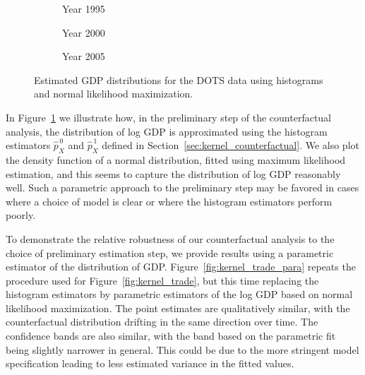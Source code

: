 \documentclass[11pt,lof]{puthesis}
\theoremstyle{break}
\theoremstyle{proof}
\begin{document}
\begin{figure}[b!]
\centering
%
\begin{subfigure}{0.32\textwidth}
\centering
\caption{Year 1995}
\end{subfigure}
%
\begin{subfigure}{0.32\textwidth}
\centering
\caption{Year 2000}
\end{subfigure}
%
\begin{subfigure}{0.32\textwidth}
\centering
\caption{Year 2005}
\end{subfigure}
%
\caption[Estimated GDP distributions for the DOTS data]{
Estimated GDP distributions for the DOTS data using histograms and
normal likelihood maximization.}
%
\label{fig:kernel_gdp}
%
\end{figure}

In Figure~\ref{fig:kernel_gdp} we illustrate how, in the preliminary step of the
counterfactual analysis, the distribution of log GDP is approximated using the
histogram estimators $\hat p_X^{\,0}$ and $\hat p_X^{\,1}$ defined in
Section~\ref{sec:kernel_counterfactual}. We also plot the density function of a
normal distribution, fitted using maximum likelihood estimation, and this seems
to capture the distribution of log GDP reasonably well. Such a parametric
approach to the preliminary step may be favored in cases where a choice of
model is clear or where the histogram estimators perform poorly.

To demonstrate the relative robustness of our counterfactual analysis to the
choice of preliminary estimation step, we provide results using a
parametric estimator of the distribution of GDP.
Figure~\ref{fig:kernel_trade_para}
repeats the procedure used for Figure~\ref{fig:kernel_trade}, but this time
replacing
the histogram estimators by parametric estimators of the log GDP based on
normal likelihood maximization. The point estimates are qualitatively similar,
with the counterfactual distribution drifting in the same direction over time.
The confidence bands are also similar, with the band based on the parametric
fit being slightly narrower in general. This could be due to the more stringent
model specification leading to less estimated variance in the fitted values.
\end{document}
